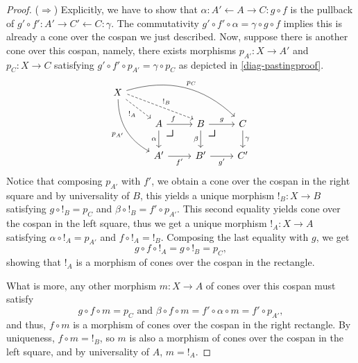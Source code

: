 \documentclass{article}
\theoremstyle{definition}
\theoremstyle{remark}
\newcommand{\pullback}{\mbox{\LARGE$\lrcorner$}}
\begin{document}
\begin{proof}
    ($\Rightarrow$) Explicitly, we have to show that $\alpha : A' \leftarrow A \rightarrow C : g \circ f$ is the pullback of $g' \circ f' : A' \rightarrow C' \leftarrow C:\gamma$. The commutativity $g'\circ f' \circ \alpha = \gamma \circ g \circ f$ implies this is already a cone over the cospan we just described. Now, suppose there is another cone over this cospan, namely, there exists morphisms $p_{A'}: X \rightarrow A'$ and $p_C: X \rightarrow C$ satisfying $g'\circ f' \circ p_{A'} = \gamma \circ p_C$ as depicted in \eqref{diag-pastingproof}.
    \begin{equation}\label{diag-pastingproof}
        \begin{tikzcd}
            X \arrow[rrrd, "p_C", bend left] \arrow[rdd, "p_{A'}"', bend right] \arrow[rrd, "{!}_B", dashed, shift left] \arrow[rd, "{!}_A"', dashed] & & & \\
            & A \arrow[r, near start, "f"] \arrow[d, "\alpha"'] \arrow[rd, "\pullback", phantom, very near start] & B \arrow[r, "g"] \arrow[d, "\beta"'] \arrow[rd, "\pullback", phantom, very near start] & C \arrow[d, "\gamma"] \\
            & A' \arrow[r, "f'"'] & B' \arrow[r, "g'"'] & C'
        \end{tikzcd}
    \end{equation}
    Notice that composing $p_{A'}$ with $f'$, we obtain a cone over the cospan in the right square and by universality of $B$, this yields a unique morphism ${!}_B: X \rightarrow B$ satisfying $g \circ {!}_B = p_C$ and $\beta \circ {!}_B = f' \circ p_{A'}$. This second equality yields cone over the cospan in the left square, thus we get a unique morphism ${!}_A : X \rightarrow A$ satisfying $\alpha \circ {!}_A = p_{A'}$ and $f \circ {!}_A = {!}_B$. Composing the last equality with $g$, we get
    \[g \circ f \circ {!}_A = g \circ {!}_B = p_C,\]
    showing that ${!}_A$ is a morphism of cones over the cospan in the rectangle.

    What is more, any other morphism $m: X \rightarrow A$ of cones over this cospan must satisfy
    \[g \circ f \circ m = p_C \text{ and } \beta \circ f \circ m = f' \circ \alpha \circ m = f' \circ p_{A'},\]
    and thus, $f\circ m$ is a morphism of cones over the cospan in the right rectangle. By uniqueness, $f\circ m = {!}_B$, so $m$ is also a morphism of cones over the cospan in the left square, and by universality of $A$, $m = {!}_A$.
    

\end{proof}
\end{document}
